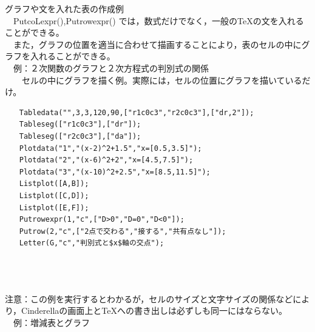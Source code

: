 \documentclass[papersize,a4paper,12pt,uplatex]{jsarticle}
\begin{document}
\begin{description}
グラフや文を入れた表の作成例\\

　PutcoLexpr(),Putrowexpr() では，数式だけでなく，一般の\TeX の文を入れることができる。\\
　また，グラフの位置を適当に合わせて描画することにより，表のセルの中にグラフを入れることができる。\\

　例：２次関数のグラフと２次方程式の判別式の関係\\
　　セルの中にグラフを描く例。実際には，セルの位置にグラフを描いているだけ。
\begin{verbatim}
　　Tabledata("",3,3,120,90,["r1c0c3","r2c0c3"],["dr,2"]);
　　Tableseg(["r1c0c3"],["dr"]);
　　Tableseg(["r2c0c3"],["da"]);
　　Plotdata("1","(x-2)^2+1.5","x=[0.5,3.5]");
　　Plotdata("2","(x-6)^2+2","x=[4.5,7.5]");
　　Plotdata("3","(x-10)^2+2.5","x=[8.5,11.5]");
　　Listplot([A,B]);
　　Listplot([C,D]);
　　Listplot([E,F]);
　　Putrowexpr(1,"c",["D>0","D=0","D<0"]);
　　Putrow(2,"c",["2点で交わる","接する","共有点なし"]);
　　Letter(G,"c","判別式と$x$軸の交点");
\end{verbatim}
　\\
　　　　　　　\\
\\
注意：この例を実行するとわかるが，セルのサイズと文字サイズの関係などにより，Cinderellaの画面上と\TeX への書き出しは必ずしも同一にはならない。\\

\newpage
　例：増減表とグラフ\\


\end{description}
\end{document}
